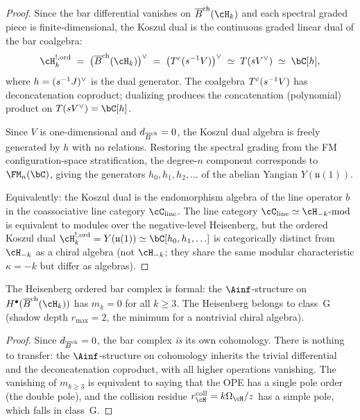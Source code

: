 \begin{proof}
Since the bar differential vanishes on $\Barch(\cH_k)$ and each
spectral graded piece is finite-dimensional, the Koszul dual is the
continuous graded linear dual of the bar coalgebra:
\[
\cH_k^{!,\mathrm{ord}}
\;=\;
\bigl(\Barch(\cH_k)\bigr)^\vee
\;=\;
\bigl(T^c(\susp^{-1}V)\bigr)^\vee
\;\simeq\;
T(\susp V^\vee)
\;\simeq\;
\bC[h],
\]
where $h = (s^{-1}J)^\vee$ is the dual generator.
The coalgebra $T^c(s^{-1}V)$ has deconcatenation
coproduct; dualizing produces the concatenation
(polynomial) product on $T(\susp V^\vee) = \bC[h]$.

Since $V$ is one-dimensional and $d_{\overline{B}^{\mathrm{ch}}} = 0$,
the Koszul dual algebra is freely generated by $h$ with
no relations. Restoring the spectral grading from the
FM configuration-space stratification, the degree-$n$
component corresponds to $\FM_n(\bC)$, giving the
generators $h_0, h_1, h_2, \ldots$ of the abelian
Yangian $Y(\mathfrak{u}(1))$.

Equivalently: the Koszul dual is the endomorphism algebra
of the line operator $b$ in the coassociative line category
$\cC_{\mathrm{line}}$. The line category
$\cC_{\mathrm{line}} \simeq \cH_{-k}\text{-}\mathrm{mod}$
is equivalent to modules over the negative-level Heisenberg,
but the ordered Koszul dual $\cH_k^{!,\mathrm{ord}} = Y(\mathfrak{u}(1))
\simeq \bC[h_0, h_1, \ldots]$ is categorically distinct from
$\cH_{-k}$ as a chiral algebra (not $\cH_{-k}$; they share the
same modular characteristic $\kappa = -k$ but differ as algebras).
\end{proof}

\begin{theorem}
\label{thm:heisenberg-formality}
The Heisenberg ordered bar complex is formal:
the $\Ainf$-structure on $H^\bullet(\Barch(\cH_k))$
has $m_k = 0$ for all $k\ge 3$. The Heisenberg
belongs to class~G \textup{(}shadow depth $r_{\max} = 2$,
the minimum for a nontrivial chiral algebra\textup{)}.
\end{theorem}

\begin{proof}
Since $d_{\overline{B}^{\mathrm{ch}}} = 0$, the bar complex \emph{is} its own
cohomology. There is nothing to transfer: the $\Ainf$-structure
on cohomology inherits the trivial differential and the
deconcatenation coproduct, with all higher operations vanishing.
The vanishing of $m_{k\ge 3}$ is equivalent to saying that the
OPE has a single pole order (the double pole),
and the collision residue $r^{\mathrm{coll}}_{\cH}=k\Omega_{\cH}/z$
has a simple pole, which falls in class~G.
\end{proof}

